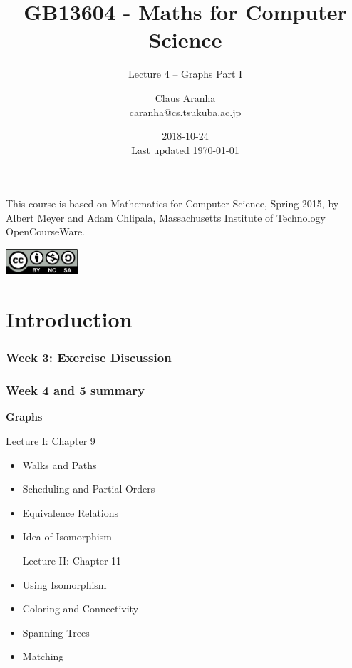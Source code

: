 \documentclass{beamer}
\title[GB13604]{GB13604 - Maths for Computer Science}
\subtitle[]{Lecture 4 -- Graphs Part I}
\author[Claus Aranha]{Claus Aranha\\{\footnotesize caranha@cs.tsukuba.ac.jp}}
\institute[COINS]{College of Information Science}
\date[2018-10-24]{2018-10-24\\{\tiny Last updated \today}}
\begin{document}
\begin{frame}
  \maketitle

  \begin{center}
    {\smaller This course is based on Mathematics for Computer Science, Spring
    2015, by Albert Meyer and Adam Chlipala, Massachusetts Institute
    of Technology OpenCourseWare.}

    \includegraphics[width=0.2\textwidth]{../img/by-nc-sa}
  \end{center}
\end{frame}

\section{Introduction}

\begin{frame}
  \frametitle{Week 3: Exercise Discussion}

\end{frame}

\begin{frame}
  \frametitle{Week 4 and 5 summary}

  {\larger
    {\bf Graphs}

    \bigskip

    \begin{center}
      Lecture I: Chapter 9
    \end{center}
    \begin{itemize}
    \item Walks and Paths
    \item Scheduling and Partial Orders
    \item Equivalence Relations
    \item Idea of Isomorphism

      \bigskip

      \begin{center}
        Lecture II: Chapter 11
      \end{center}
    \item Using Isomorphism
    \item Coloring and Connectivity
    \item Spanning Trees
    \item Matching
    \end{itemize}
  }
\end{frame}
\end{document}
